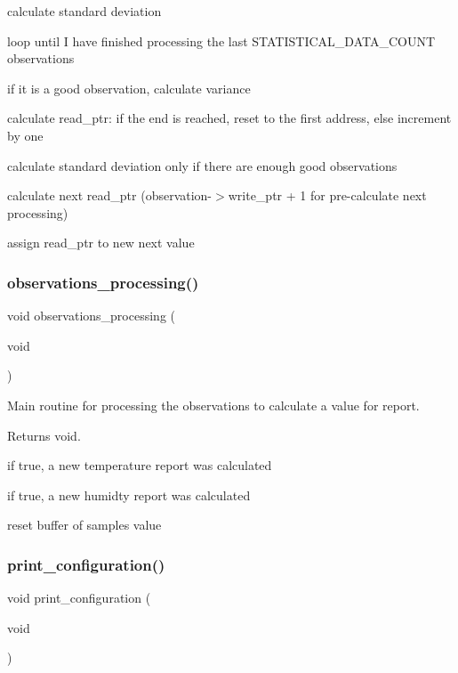 calculate standard deviation

loop until I have finished processing the last S\+T\+A\+T\+I\+S\+T\+I\+C\+A\+L\+\_\+\+D\+A\+T\+A\+\_\+\+C\+O\+U\+NT observations

if it is a good observation, calculate variance

calculate read\+\_\+ptr\+: if the end is reached, reset to the first address, else increment by one

calculate standard deviation only if there are enough good observations

calculate next read\+\_\+ptr (observation-\/$>$write\+\_\+ptr + 1 for pre-\/calculate next processing)

assign read\+\_\+ptr to new next value \mbox{\label{i2c-th_8h_a8b67eda853f3e8cca0c729267b492861}} 
\subsubsection{\texorpdfstring{observations\+\_\+processing()}{observations\_processing()}}
{\footnotesize\ttfamily void observations\+\_\+processing (\begin{DoxyParamCaption}\item[{void}]{ }\end{DoxyParamCaption})}



Main routine for processing the observations to calculate a value for report. 

\begin{DoxyReturn}{Returns}
void. 
\end{DoxyReturn}
if true, a new temperature report was calculated

if true, a new humidty report was calculated

reset buffer of samples value \mbox{\label{i2c-th_8h_ab08b9047f47849f399950705e769be2e}} 
\subsubsection{\texorpdfstring{print\+\_\+configuration()}{print\_configuration()}}
{\footnotesize\ttfamily void print\+\_\+configuration (\begin{DoxyParamCaption}\item[{void}]{ }\end{DoxyParamCaption})}



